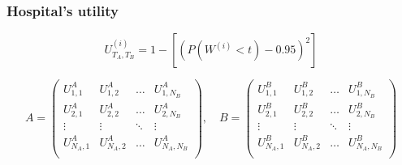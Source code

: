 \begin{frame}
    \frametitle{Hospital's utility}

    \begin{equation*}
        U_{T_A,T_B}^{(i)} = 1 - \left[ (P(W^{(i)} < t) - 0.95)^2 \right]
    \end{equation*}

    \scriptsize
    \begin{equation*}
        A = 
        \begin{pmatrix}
            U_{1,1}^A & U_{1,2}^A & \dots & U_{1,N_B}^A \\ 
            U_{2,1}^A & U_{2,2}^A & \dots & U_{2,N_B}^A \\
            \vdots & \vdots & \ddots & \vdots \\
            U_{N_A,1}^A & U_{N_A,2}^A & \dots & U_{N_A,N_B}^A \\
        \end{pmatrix}, \quad
        B = 
        \begin{pmatrix}
            U_{1,1}^B & U_{1,2}^B & \dots & U_{1,N_B}^B \\ 
            U_{2,1}^B & U_{2,2}^B & \dots & U_{2,N_B}^B \\
            \vdots & \vdots & \ddots & \vdots \\
            U_{N_A,1}^B & U_{N_A,2}^B & \dots & U_{N_A,N_B}^B \\
        \end{pmatrix}
    \end{equation*}

\end{frame}


